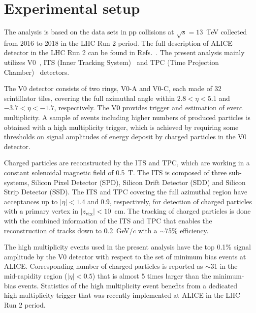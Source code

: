 
\section{Experimental setup}
\label{sec:experiment}

The analysis is based on the data sets in pp collisions at $\sqrt{s} = 13$~TeV collected from 2016 to 2018 in the LHC Run 2 period.  The full description of ALICE detector in the LHC Run 2 can be found in Refs.~\cite{Aamodt:2008zz,Abelev:2014ffa}. The present analysis mainly utilizes V0~\cite{Abbas:2013taa}, ITS (Inner Tracking System)~\cite{aliceITS} and TPC (Time Projection Chamber)~\cite{aliceTPC} detectors.


The V0 detector consists of two rings, V0-A and V0-C, each made of 32 scintillator tiles, covering the full azimuthal angle within $2.8 < \eta < 5.1$ and $-3.7 < \eta < -1.7$, respectively. The V0 provides trigger and estimation of event multiplicity. A sample of events including higher numbers of produced particles is obtained with a high multiplicity trigger, which is achieved by requiring some thresholds on signal amplitudes of energy deposit by charged particles in the V0 detector.

Charged particles are reconstructed by the ITS and TPC, which are working in a constant solenoidal magnetic field of 0.5~T.  The ITS is composed of three sub-systems, Silicon Pixel Detector (SPD), Silicon Drift Detector (SDD) and Silicon Strip Detector (SSD). The ITS and TPC covering the full azimuthal region have acceptances up to $|\eta| < 1.4$ and 0.9, respectively, for detection of charged particles with a primary vertex in $|z_\mathrm{vtx}| < 10$~cm. The tracking of charged particles is done with the combined information of the ITS and TPC that enables the reconstruction of tracks down to 0.2~GeV/$c$ with a $\sim $75\% efficiency.


The high multiplicity events used in the present analysis have the top 0.1\% signal amplitude by the V0 detector with respect to the set of minimum bias events at ALICE. Corresponding number of charged particles is reported as $\sim$31 in the mid-rapidity region ($|\eta|<0.5$) that is almost 5 times larger than the minimum-bias events.  Statistics of the high multiplicity event benefits from a dedicated high multiplicity trigger that was recently implemented at ALICE  in the LHC Run 2 period.  
 


